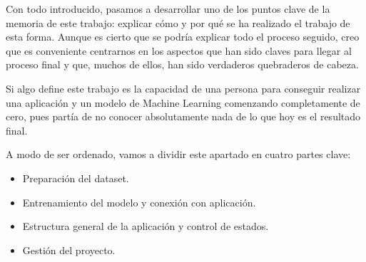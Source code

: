 

	Con todo introducido, pasamos a desarrollar uno de los puntos clave de la memoria de este trabajo: explicar cómo y por qué se ha realizado el trabajo de esta forma. Aunque es cierto que se podría explicar todo el proceso seguido, creo que es conveniente centrarnos en los aspectos que han sido claves para llegar al proceso final y que, muchos de ellos, han sido verdaderos quebraderos de cabeza.
	
	Si algo define este trabajo es la capacidad de una persona para conseguir realizar una aplicación y un modelo de Machine Learning comenzando completamente de cero, pues partía de no conocer absolutamente nada de lo que hoy es el resultado final. 
	
	A modo de ser ordenado, vamos a dividir este apartado en cuatro partes clave:
	\begin{itemize}
		\item Preparación del dataset.
		\item Entrenamiento del modelo y conexión con aplicación.
		\item Estructura general de la aplicación y control de estados.
		\item Gestión del proyecto.
	\end{itemize}
	
